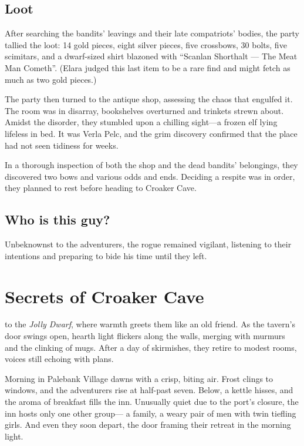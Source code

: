 \documentclass[
  letterpaper,12pt,twoside,twocolumn,openany,
  nodeprecatedcode,bg=full]{dndbook}
\begin{document}
\section{Loot}\label{loot}

After searching the bandits' leavings and their late compatriots'
bodies, the party tallied the loot: 14 gold pieces, eight silver pieces,
five crossbows, 30 bolts, five scimitars, and a dwarf-sized shirt
blazoned with ``Scanlan Shorthalt --- The Meat Man Cometh''. (Elara
judged this last item to be a rare find and might fetch as much as two
gold pieces.)

The party then turned to the antique shop, assessing the chaos that
engulfed it. The room was in disarray, bookshelves overturned and
trinkets strewn about. Amidst the disorder, they stumbled upon a
chilling sight---a frozen elf lying lifeless in bed. It was Verla Pelc,
and the grim discovery confirmed that the place had not seen tidiness
for weeks.

In a thorough inspection of both the shop and the dead bandits'
belongings, they discovered two bows and various odds and ends. Deciding
a respite was in order, they planned to rest before heading to Croaker
Cave.

\section{Who is this guy?}\label{who-is-this-guy}

Unbeknownst to the adventurers, the rogue remained vigilant, listening
to their intentions and preparing to bide his time until they left.

\chapter{Secrets of Croaker Cave}\label{secrets-of-croaker-cave}

\hfill\break to the
\emph{Jolly Dwarf}, where warmth greets them like an old friend. As the
tavern's door swings open, hearth light flickers along the walls,
merging with murmurs and the clinking of mugs. After a day of
skirmishes, they retire to modest rooms, voices still echoing with
plans.

Morning in Palebank Village dawns with a crisp, biting air. Frost clings
to windows, and the adventurers rise at half-past seven. Below, a kettle
hisses, and the aroma of breakfast fills the inn. Unusually quiet due to
the port's closure, the inn hosts only one other group--- a family, a
weary pair of men with twin tiefling girls. And even they soon depart,
the door framing their retreat in the morning light.
\end{document}
